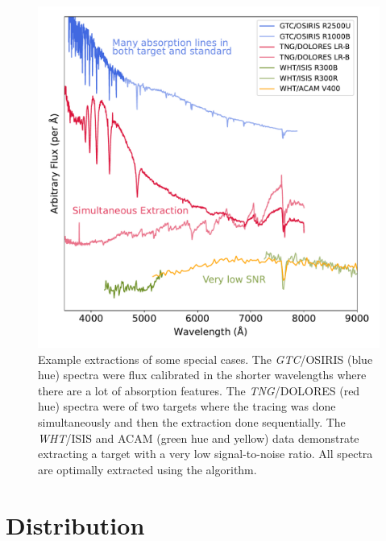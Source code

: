 \documentclass[linenumbers, twocolumn]{aastex631}
\begin{document}
\begin{figure}
    \centering
    \includegraphics[width=\textwidth]{fig_09_use_case_plots.pdf}
    \caption{Example extractions of some special cases. The \textit{GTC}/OSIRIS (blue hue)
    spectra were flux calibrated in the shorter wavelengths where there are a lot
    of absorption features. The \textit{TNG}/DOLORES (red hue) spectra were of two targets where the
    tracing was done simultaneously and then the extraction done
    sequentially. The \textit{WHT}/ISIS and ACAM (green hue and yellow) data demonstrate extracting a
    target with a very low signal-to-noise ratio. All spectra are optimally extracted using the \citet{1986PASP...98..609H} algorithm.}
    \label{fig:use_cases}
\end{figure}

\section{Distribution}
\label{sec:distribution}
\end{document}
